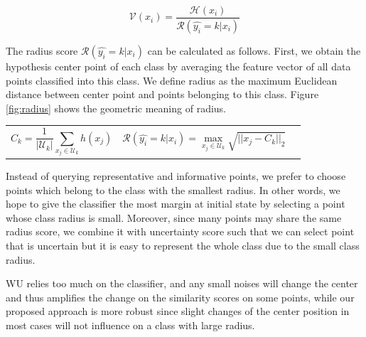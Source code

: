 \begin{equation}
\mathcal{V}(x_i) = \frac{\mathcal{H}(x_i)} {\mathcal{R}(\hat{y_i}=k|x_i)}
\end{equation}
    
The radius score $\mathcal{R}(\hat{y_i}=k|x_i)$ can be calculated as follows. First, we obtain the hypothesis center point of each class by averaging the feature vector of all data points classified into this class. We define radius as the maximum Euclidean distance between center point and points belonging to this class. Figure \ref{fig:radius} shows the geometric meaning of radius.
\begin{tabularx}{\textwidth}{@{}XXX@{}}
    \footnotesize
    \begin{equation}
        C_k = \frac{1}{|\mathcal{U}_k|} \sum_{x_j \in \mathcal{U}_k} h(x_j)
    \label{eqn:1}
    \end{equation} &
    \begin{equation}
        \mathcal{R}(\hat{y_i}=k|x_i) = \max_{x_j \in \mathcal{U}_k} \sqrt{||x_j - C_k||_2} 
    \label{eqn:2}
    \end{equation}
\end{tabularx}


    
Instead of querying representative and informative points, we prefer to choose points which belong to the class with the smallest radius. 
In other words, we hope to give the classifier the most margin at initial state by selecting a point whose class radius is small. Moreover, since many points may share the same radius score, we combine it with uncertainty score such that we can select point that is uncertain but it is easy to represent the whole class due to the small class radius.
    
WU relies too much on the classifier, and any small noises will change the center and thus amplifies the change on the similarity scores on some points, while our proposed approach is more robust since slight changes of the center position in most cases will not influence on a class with large radius.
    

